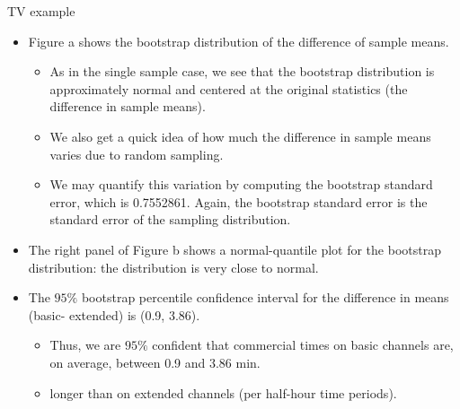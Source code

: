 \documentclass[
  ignorenonframetext,
]{beamer}
\providecommand{\tightlist}{%
  \setlength{\itemsep}{0pt}\setlength{\parskip}{0pt}}
\begin{document}
\begin{frame}{TV example}
\label{tv-example-5}
\begin{itemize}
\item
  Figure a shows the bootstrap distribution of the difference of sample
  means.

  \begin{itemize}
  \tightlist
  \item
    As in the single sample case, we see that the bootstrap distribution
    is approximately normal and centered at the original statistics (the
    difference in sample means).
  \item
    We also get a quick idea of how much the difference in sample means
    varies due to random sampling.
  \item
    We may quantify this variation by computing the bootstrap standard
    error, which is 0.7552861. Again, the bootstrap standard error is
    the standard error of the sampling distribution.
  \end{itemize}
\item
  The right panel of Figure b shows a normal-quantile plot for the
  bootstrap distribution: the distribution is very close to normal.
\item
  The \(95\%\) bootstrap percentile confidence interval for the
  difference in means (basic- extended) is (0.9, 3.86).

  \begin{itemize}
  \tightlist
  \item
    Thus, we are \(95\%\) confident that commercial times on basic
    channels are, on average, between 0.9 and 3.86 min.
  \item
    longer than on extended channels (per half-hour time periods).
  \end{itemize}
\end{itemize}
\end{frame}
\end{document}

